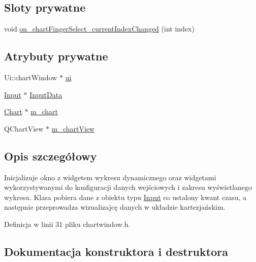 \subsection*{Sloty prywatne}
\begin{DoxyCompactItemize}
\item 
void \hyperlink{classchart_window_a2d9399679ac24942f51e498e39058689}{on\+\_\+chart\+Finger\+Select\+\_\+current\+Index\+Changed} (int index)
\end{DoxyCompactItemize}
\subsection*{Atrybuty prywatne}
\begin{DoxyCompactItemize}
\item 
Ui\+::chart\+Window $\ast$ \hyperlink{classchart_window_a0efd4a0d018eaa19c813c9d69522c75e}{ui}
\item 
\hyperlink{class_input}{Input} $\ast$ \hyperlink{classchart_window_ae779978e0ea70d11bc4324e6bb448641}{Input\+Data}
\item 
\hyperlink{class_chart}{Chart} $\ast$ \hyperlink{classchart_window_ab91e89e2af69240eaa9834f3df7b3e71}{m\+\_\+chart}
\item 
Q\+Chart\+View $\ast$ \hyperlink{classchart_window_af045aa91399d39e818b8c50242449a63}{m\+\_\+chart\+View}
\end{DoxyCompactItemize}


\subsection{Opis szczegółowy}
Inicjalizuje okno z widgetem wykresu dynamicznego oraz widgetami wykorzystywanymi do konfiguracji danych wejściowych i zakresu wyświetlanego wykresu. Klasa pobiera dane z obiektu typu \hyperlink{class_input}{Input} co ustalony kwant czasu, a następnie przeprowadza wizualizajcę danych w układzie kartezjańskim. 

Definicja w linii 31 pliku chartwindow.\+h.



\subsection{Dokumentacja konstruktora i destruktora}
\mbox{\label{classchart_window_a3e5f564f088a1159e1da8a8d9d970e76}} 
